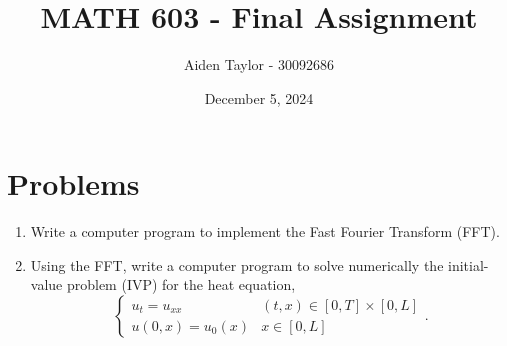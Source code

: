 \documentclass[11pt]{article}
\title{MATH 603 - Final Assignment}
\author{Aiden Taylor - 30092686}
\date{December 5, 2024}
\begin{document}
\maketitle \newpage \tableofcontents
\newpage
\section{Problems}
	\begin{enumerate}[1.]
		\item Write a computer program to implement the Fast Fourier Transform (FFT).
	\item Using the FFT, write a computer program to solve numerically
		the initial-value problem (IVP) for the heat equation,
			\begin{equation*}
		\begin{cases}
			u_t = u_{xx} & (t,x) \in [0,T] \times [0,L] \\
			u(0,x) = u_0(x) & x \in [0,L]
		\end{cases}.
			\end{equation*}
	\end{enumerate}
\newpage
\end{document}
